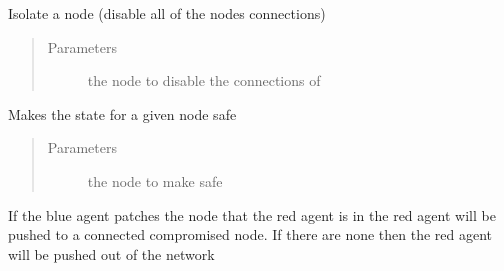 \documentclass[letterpaper,10pt,english]{sphinxmanual}
\begin{document}
\begin{fulllineitems}
\begin{fulllineitems}
\label{\detokenize{source/yawning_titan.envs.generic.core:yawning_titan.envs.generic.core.network_interface.NetworkInterface.isolate_node}}
\sphinxAtStartPar
Isolate a node (disable all of the nodes connections)
\begin{quote}\begin{description}
\item[{Parameters}] \leavevmode
\sphinxAtStartPar
{} \textendash{} the node to disable the connections of

\end{description}\end{quote}

\end{fulllineitems}


\begin{fulllineitems}
\label{\detokenize{source/yawning_titan.envs.generic.core:yawning_titan.envs.generic.core.network_interface.NetworkInterface.make_node_safe}}
\sphinxAtStartPar
Makes the state for a given node safe
\begin{quote}\begin{description}
\item[{Parameters}] \leavevmode
\sphinxAtStartPar
{} \textendash{} the node to make safe

\end{description}\end{quote}

\end{fulllineitems}


\begin{fulllineitems}
\label{\detokenize{source/yawning_titan.envs.generic.core:yawning_titan.envs.generic.core.network_interface.NetworkInterface.push_red}}
\sphinxAtStartPar
If the blue agent patches the node that the red agent is in the red agent will be pushed to a connected
compromised node. If there are none then the red agent will be pushed out of the network


\end{fulllineitems}
\end{fulllineitems}
\end{document}
